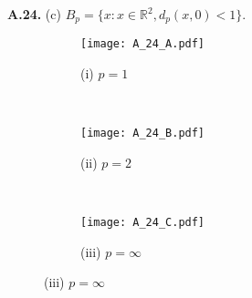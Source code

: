 \documentclass[12pt]{article}
\begin{document}
{\bf A.24.} (c) $B_{p} = \{x : x\in\mathbb{R}^{2}, d_{p}(x,0) < 1\}$.

\begin{figure}[b]
\captionsetup[subfigure]{labelformat=empty}
\centering
\begin{subfigure}[b]{0.3\textwidth}
\texttt{[image: A\_24\_A.pdf]}
\caption{(i) $p = 1$}
\end{subfigure}
  ~ %
\begin{subfigure}[b]{0.3\textwidth}
\texttt{[image: A\_24\_B.pdf]}
\caption{(ii) $p = 2$}
\end{subfigure}
  ~ %
\begin{subfigure}[b]{0.3\textwidth}
\texttt{[image: A\_24\_C.pdf]}
\caption{(iii) $p = \infty$}
\end{subfigure}
\end{figure}
\end{document}
